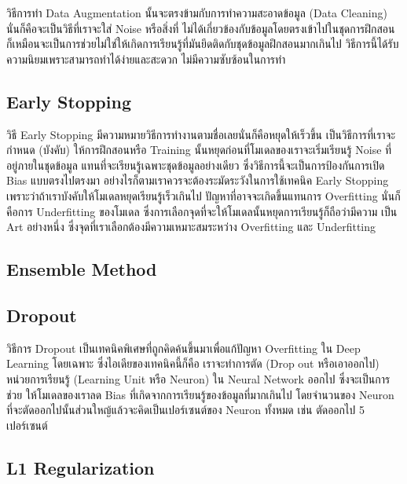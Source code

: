 วิธีการทำ Data Augmentation นั้นจะตรงข้ามกับการทำความสะอาดข้อมูล (Data Cleaning) นั่นก็คือจะเป็นวิธีที่เราจะใส่ Noise หรือสิ่งที่%
ไม่ได้เกี่ยวข้องกับข้อมูลโดยตรงเข้าไปในชุดการฝึกสอน ก็เหมือนจะเป็นการช่วยไม่ใช่ให้เกิดการเรียนรู้ที่มันยึดติดกับชุดข้อมูลฝึกสอนมากเกินไป
วิธีการนี้ได้รับความนิยมเพราะสามารถทำได้ง่ายและสะดวก ไม่มีความซับซ้อนในการทำ




\subsection{Early Stopping}

วิธี Early Stopping มีความหมายวิธีการทำงานตามชื่อเลยนั่นก็คือหยุดให้เร็วขึ้น เป็นวิธีการที่เราจะกำหนด (บังคับ) ให้การฝึกสอนหรือ Training 
นั้นหยุดก่อนที่โมเดลของเราจะเริ่มเรียนรู้ Noise ที่อยู่ภายในชุดข้อมูล แทนที่จะเรียนรู้เฉพาะชุดข้อมูลอย่างเดียว ซึ่งวิธีการนี้จะเป็นการป้องกันการเปิด 
Bias แบบตรงไปตรงมา อย่างไรก็ตามเราควรจะต้องระมัดระวังในการใช้เทคนิค Early Stopping เพราะว่าถ้าเราบังคับให้โมเดลหยุดเรียนรู้เร็วเกินไป
ปัญหาที่อาจจะเกิดขึ้นแทนการ Overfitting นั่นก็คือการ Underfitting ของโมเดล ซึ่งการเลือกจุดที่จะให้โมเดลนั้นหยุดการเรียนรู้ก็ถือว่ามีความ%
เป็น Art อย่างหนึ่ง ซึ่งจุดที่เราเลือกต้องมีความเหมาะสมระหว่าง Overfitting และ Underfitting

\subsection{Ensemble Method}


\subsection{Dropout}

วิธีการ Dropout เป็นเทคนิคพิเศษที่ถูกคิดค้นขึ้นมาเพื่อแก้ปัญหา Overfitting ใน Deep Learning โดยเฉพาะ ซึ่งไอเดียของเทคนิคนี้ก็คือ%
เราจะทำการตัด (Drop out หรือเอาออกไป) หน่วยการเรียนรู้ (Learning Unit หรือ Neuron) ใน Neural Network ออกไป ซึ่งจะเป็นการช่วย%
ให้โมเดลของเราลด Bias ที่เกิดจากการเรียนรู้ของข้อมูลที่มากเกินไป โดยจำนวนของ Neuron ที่จะตัดออกไปนั้นส่วนใหญ้แล้วจะคิดเป็นเปอร์เซนต์ของ
Neuron ทั้งหมด เช่น ตัดออกไป 5 เปอร์เซนต์

\subsection{L1 Regularization}

